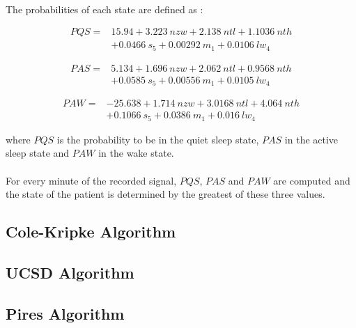 \documentclass[a4paper,10pt]{article}
\begin{document}
\paragraph{}
The probabilities of each state are defined as :

\begin{equation}
\begin{split}
PQS =& 15.94 + 3.223\: nzw + 2.138\: ntl + 1.1036\: nth \\
      &+ 0.0466\: s_5 + 0.00292\: m_1 + 0.0106\: lw_4
\end{split}
\end{equation}

\begin{equation}
\begin{split}
PAS =& 5.134 + 1.696\: nzw + 2.062\: ntl + 0.9568\: nth \\
      &+ 0.0585\: s_5 + 0.00556\: m_1 + 0.0105\: lw_4
\end{split}
\end{equation}

\begin{equation}
\begin{split}
PAW =& -25.638 + 1.714\: nzw + 3.0168\: ntl + 4.064\: nth \\
      &+ 0.1066\: s_5 + 0.0386\: m_1 + 0.016\: lw_4
\end{split}
\end{equation}

where $PQS$ is the probability to be in the quiet sleep state, $PAS$ in the active sleep state and $PAW$ in the wake state.

\paragraph{}
For every minute of the recorded signal, $PQS$, $PAS$ and $PAW$ are computed and the state of the patient is determined by the greatest of these three values.

\subsection{Cole-Kripke Algorithm}

\subsection{UCSD Algorithm} 

\subsection{Pires Algorithm}
\end{document}
